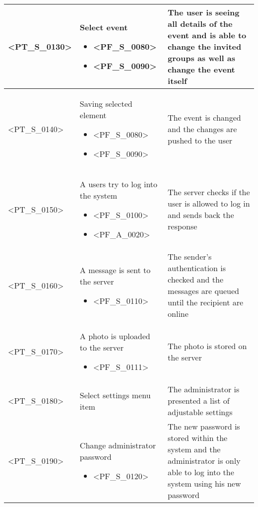 \begin{longtable} {| p{} | p{} | p{} |}
    <PT\_S\_0130> & 
    Select event
        \begin{itemize} 
            \item <PF\_S\_0080>
            \item <PF\_S\_0090>
        \end{itemize} & 
    The user is seeing all details of the event and is able to change the invited groups as well as change the event itself \\ \hline
    
    <PT\_S\_0140> & 
    Saving selected element
        \begin{itemize} 
            \item <PF\_S\_0080>
            \item <PF\_S\_0090>
        \end{itemize} & 
    The event is changed and the changes are pushed to the user \\ \hline
    
    <PT\_S\_0150> & 
    A users try to log into the system
        \begin{itemize} 
            \item <PF\_S\_0100>
            \item <PF\_A\_0020>
        \end{itemize} & 
    The server checks if the user is allowed to log in and sends back the response \\ \hline
    
    <PT\_S\_0160> & 
    A message is sent to the server
        \begin{itemize} 
            \item <PF\_S\_0110>
        \end{itemize} & 
    The sender's authentication is checked and the messages are queued until the recipient are online \\ \hline
    
    <PT\_S\_0170> & 
    A photo is uploaded to the server
        \begin{itemize} 
            \item <PF\_S\_0111>
        \end{itemize} & 
    The photo is stored on the server \\ \hline
    
    <PT\_S\_0180> & 
    Select settings menu item & 
    The administrator is presented a list of adjustable settings \\ \hline
    
    <PT\_S\_0190> & 
    Change administrator password
        \begin{itemize} 
            \item <PF\_S\_0120>
        \end{itemize} & 
    The new password is stored within the system and the administrator is only able to log into the system using his new password \\ \hline
    

\end{longtable}
